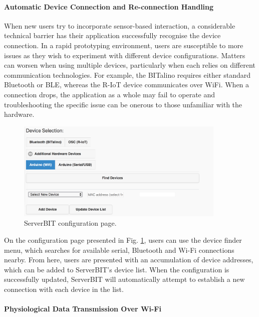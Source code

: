 \paragraph{Automatic Device Connection and Re-connection Handling}
When new users try to incorporate sensor-based interaction, a considerable technical barrier has their application successfully recognise the device connection. In a rapid prototyping environment, users are susceptible to more issues as they wish to experiment with different device configurations. Matters can worsen when using multiple devices, particularly when each relies on different communication technologies. For example, the BITalino requires either standard Bluetooth or BLE, whereas the R-IoT device communicates over WiFi. When a connection drops, the application as a whole may fail to operate and troubleshooting the specific issue can be onerous to those unfamiliar with the hardware.

\begin{figure}[htb!]
    \centering
    \includegraphics[width=100mm,scale=1.0]{Chapters/Figures/technical/ServerBIT/device_selection.png}
    \caption{ServerBIT configuration page.}
    \label{fig:dev_selection}
\end{figure}

On the configuration page presented in Fig. \ref{fig:dev_selection}, users can use the device finder menu, which searches for available serial, Bluetooth and Wi-Fi connections nearby. From here, users are presented with an accumulation of device addresses, which can be added to ServerBIT's device list. When the configuration is successfully updated, ServerBIT will automatically attempt to establish a new connection with each device in the list.

\paragraph{Physiological Data Transmission Over Wi-Fi} \label{riot}


